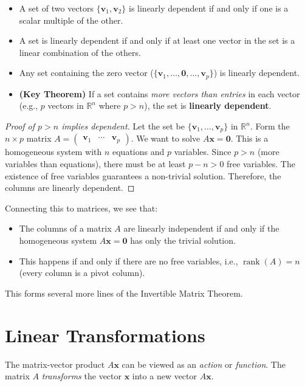 \begin{property}
\begin{itemize}
    \item A set of two vectors $\{\mathbf{v}_1, \mathbf{v}_2\}$ is linearly dependent if and only if one is a scalar multiple of the other.
    \item A set is linearly dependent if and only if at least one vector in the set is a linear combination of the others.
    \item Any set containing the zero vector ($\{\mathbf{v}_1, \ldots, \mathbf{0}, \ldots, \mathbf{v}_p\}$) is linearly dependent.
    \item \textbf{(Key Theorem)} If a set contains \emph{more vectors than entries} in each vector (e.g., $p$ vectors in $\mathbb{R}^n$ where $p > n$), the set is \textbf{linearly dependent}.
\end{itemize}
\end{property}
\begin{proof}[Proof of $p > n$ implies dependent]
Let the set be $\{\mathbf{v}_1, \ldots, \mathbf{v}_p\}$ in $\mathbb{R}^n$.
Form the $n \times p$ matrix $A = \begin{pmatrix} \mathbf{v}_1 & \cdots & \mathbf{v}_p \end{pmatrix}$.
We want to solve $A\mathbf{x} = \mathbf{0}$.
This is a homogeneous system with $n$ equations and $p$ variables.
Since $p > n$ (more variables than equations), there must be at least $p - n > 0$ free variables.
The existence of free variables guarantees a non-trivial solution.
Therefore, the columns are linearly dependent.
\end{proof}

Connecting this to matrices, we see that:
\begin{itemize}
    \item The columns of a matrix $A$ are linearly independent if and only if the homogeneous system $A\mathbf{x} = \mathbf{0}$ has only the trivial solution.
    \item This happens if and only if there are no free variables, i.e., $\operatorname{rank}(A) = n$ (every column is a pivot column).
\end{itemize}
This forms several more lines of the Invertible Matrix Theorem.

\section{Linear Transformations}
The matrix-vector product $A\mathbf{x}$ can be viewed as an \emph{action} or \emph{function}. The matrix $A$ \emph{transforms} the vector $\mathbf{x}$ into a new vector $A\mathbf{x}$.

